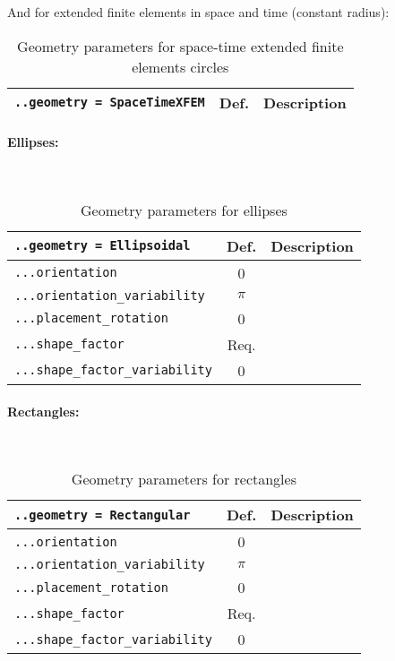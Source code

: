\documentclass[10pt]{article}
\newcommand{\whiteline}{\textcolor{white}{.\\}}
\begin{document}
And for extended finite elements in space and time (constant radius):

\begin{table}[h!]
\begin{tabularx}{\textwidth}{lcX}
\verb+..geometry = SpaceTimeXFEM+ & Def. & Description\\
\hline
\end{tabularx}
\caption{Geometry parameters for space-time extended finite elements circles}
\end{table}

\paragraph{Ellipses:} \whiteline

\begin{table}[h!]
\begin{tabularx}{\textwidth}{lcX}
\verb+..geometry = Ellipsoidal+ & Def. & Description\\
\hline
\verb+...orientation+ & 0 & \\
\verb+...orientation_variability+ & $\pi$ & \\
\verb+...placement_rotation+ & 0 & \\
\verb+...shape_factor+ &  Req. & \\
\verb+...shape_factor_variability+ & 0 & \\
\hline
\end{tabularx}
\caption{Geometry parameters for ellipses}
\end{table}

\eject

\paragraph{Rectangles:} \whiteline

\begin{table}[h!]
\begin{tabularx}{\textwidth}{lcX}
\verb+..geometry = Rectangular+ & Def. & Description\\
\hline
\verb+...orientation+ & 0 & \\
\verb+...orientation_variability+ & $\pi$ & \\
\verb+...placement_rotation+ & 0 & \\
\verb+...shape_factor+ &  Req. & \\
\verb+...shape_factor_variability+ & 0 & \\
\hline
\end{tabularx}
\caption{Geometry parameters for rectangles}
\end{table}
\end{document}
